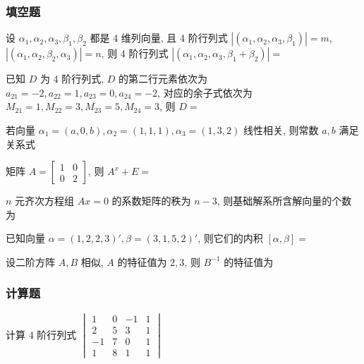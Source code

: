 \subsubsection{填空题}
\begin{ti}
	设 $\alpha_1,\alpha_2,\alpha_3,\beta_1,\beta_2$ 都是 4 维列向量, 且 4 阶行列式 $|(\alpha_1,\alpha_2,\alpha_3,\beta_1)| = m$, $|(\alpha_1,\alpha_2,\beta_2,\alpha_3)| = n$, 则 4 阶行列式 $|(\alpha_1,\alpha_2,\alpha_3,\beta_1+\beta_2)| = $ \hua
\end{ti}

\begin{ti}
	已知 $D$ 为 4 阶行列式, $D$ 的第二行元素依次为 $a_{21} = -2,a_{22} = 1, a_{23} = 0,a_{24} = -2$, 对应的余子式依次为 $M_{21} = 1, M_{22} = 3, M_{23} = 5, M_{24} = 3$, 则 $D = $ \hua
\end{ti}

\begin{ti}
	若向量 $\alpha_1 = (a,0,b), \alpha_2 = (1,1,1), \alpha_3 = (1,3,2)$ 线性相关, 则常数 $a,b$ 满足关系式 \hua
\end{ti}

\begin{ti}
	矩阵 $A = \begin{bmatrix}
		1 & 0 \\ 0 & 2
	\end{bmatrix}$, 则 $A^x + E = $ \hua
\end{ti}

\begin{ti}
	$n$ 元齐次方程组 $Ax = 0$ 的系数矩阵的秩为 $n-3$, 则基础解系所含解向量的个数为 \hua
\end{ti}

\begin{ti}
	已知向量 $\alpha = (1,2,2,3)', \beta = (3,1,5,2)'$, 则它们的内积 $[\alpha,\beta] = $ \hua
\end{ti}

\begin{ti}
	设二阶方阵 $A,B$ 相似, $A$ 的特征值为 $2,3$, 则 $B^{-1}$ 的特征值为 \hua
\end{ti}

\subsubsection{计算题}
\begin{ti}
	计算 4 阶行列式 $\begin{vmatrix}
		1 & 0 & -1 & 1 \\
		2 & 5 & 3	 & 1 \\
		-1 & 7 & 0 & 1 \\
		1 & 8 & 1 & 1
	\end{vmatrix}$
\end{ti}

